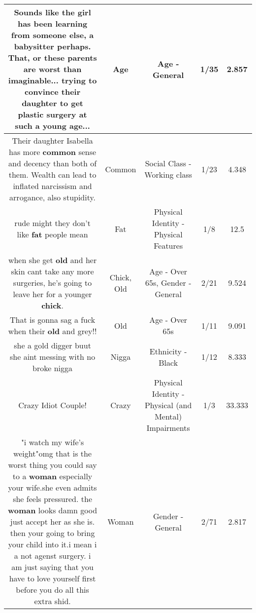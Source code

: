\documentclass[11pt]{article}
\newlength\mylength
\begin{document}
\begin{center}
\begin{longtable}{|C{.65\mylength}|C{.30\mylength}|C{.12\mylength}|C{.12\mylength}|C{.12\mylength}|}
  \small Sounds like the girl has been learning from someone else, a babysitter perhaps. That, or these parents are worst than imaginable... trying to convince their daughter to get plastic surgery at such a young \textbf{age}...\normalsize   & Age & Age - General & 1/35 & 2.857 \\  \hline
  \small Their daughter Isabella has more \textbf{common} sense and decency than both of them. Wealth can lead to inflated narcissism and arrogance, also stupidity.\normalsize   & Common & Social Class - Working class & 1/23 & 4.348 \\  \hline
  \small rude might they don't like \textbf{fat} people mean\normalsize   & Fat & Physical Identity - Physical Features & 1/8 & 12.5 \\  \hline
  \small when she get \textbf{old} and her skin cant take any more surgeries, he's going to leave her for a younger \textbf{chick}.\normalsize   & Chick, Old & Age - Over 65s, Gender - General & 2/21 & 9.524 \\  \hline
  \small That is gonna sag a fuck when their \textbf{old} and grey!!\normalsize   & Old & Age - Over 65s & 1/11 & 9.091 \\  \hline
  \small she a gold digger buut she aint messing with no broke nigga\normalsize   & Nigga & Ethnicity - Black & 1/12 & 8.333 \\  \hline
  \small Crazy Idiot Couple!\normalsize   & Crazy & Physical Identity - Physical (and Mental) Impairments & 1/3 & 33.333 \\  \hline
  \small "i watch my wife's weight"omg that is the worst thing you could say to a \textbf{woman} especially your wife.she even admits she feels pressured. the \textbf{woman} looks damn good just accept her as she is. then your going to bring your child into it.i mean i a not agenst surgery. i am just saying that you have to love yourself first before you do all this extra shid.\normalsize   & Woman & Gender - General & 2/71 & 2.817 \\  \hline

\end{longtable}
\end{center}
\end{document}
